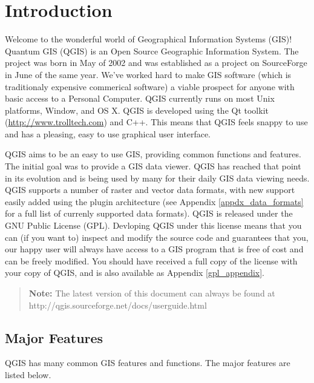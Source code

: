 \chapter{Introduction}

Welcome to the wonderful world of Geographical Information Systems (GIS)! Quantum GIS (QGIS) is an Open Source Geographic Information System. The project was born in May of 2002 and was established as a project on SourceForge in June of the same year. We've worked hard to make GIS software (which is traditionaly expensive commerical software) a viable prospect for anyone with basic access to a Personal Computer. QGIS currently runs on most Unix platforms, Window, and OS X. QGIS is developed using the Qt toolkit (\url{http://www.trolltech.com}) and C++. This means that QGIS feels snappy to use and has a pleasing, easy to use graphical user interface. 

QGIS aims to be an easy to use GIS, providing common functions and features. The initial goal was to provide a GIS data viewer. QGIS has reached that point in its evolution and is being used by many for their daily GIS data viewing needs. QGIS supports a number of raster and vector data formats, with new support easily added using the plugin architecture (see Appendix \ref{appdx_data_formats} for a full list of currenly supported data formats). QGIS is released under the GNU Public License (GPL). Devloping QGIS under this license means that you can (if you want to) inspect and modify the source code and guarantees that you, our happy user will always have access to a GIS program that is free of cost and can be freely modified. You should have received a full copy of the license with your copy of QGIS, and is also available as Appendix \ref{gpl_appendix}.  
\begin{quote}
\begin{center}
\textbf{Note:} The latest version of this document can always be found at \newline
http://qgis.sourceforge.net/docs/userguide.html 
\end{center}
\end{quote}

\section{Major Features}

QGIS has many common GIS features and functions. The major features
are listed below. 

